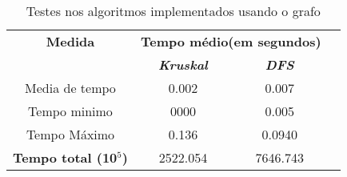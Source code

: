 \documentclass[12pt]{article}
\begin{document}
  \begin{table}[htbp]
    \caption{Testes nos algoritmos implementados usando o grafo }
    \begin{center}
    \begin{tabular}{|c|c|c|c|}
      \hline
      \textbf{Medida}&\multicolumn{2}{|c|}{\textbf{Tempo médio(em segundos)}} \\
      \cline{2-3} 
      \textbf{} & \textbf{\textit{Kruskal}}& \textbf{\textit{DFS}} \\
      \hline
      Media de tempo& 0.002 & 0.007 \\
      \hline
      Tempo minimo& 0000 & 0.005 \\
      \hline
      Tempo Máximo&  0.136 & 0.0940 \\
      \hline
      \textbf{Tempo total (10$^{\mathrm{5}}$)} & 2522.054 & 7646.743 \\
      \hline
    \end{tabular}
    \end{center}
  \end{table}

  \newpage
\end{document}
